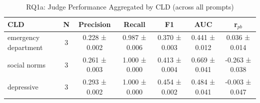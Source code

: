 \begin{table}[htbp]
\centering
\caption{RQ1a: Judge Performance Aggregated by CLD (across all prompts)}
\label{tab:rq1a_by_cld}
\begin{tabular}{lcccccc}
\toprule
\textbf{CLD} & \textbf{N} & \textbf{Precision} & \textbf{Recall} & \textbf{F1} & \textbf{AUC} & \textbf{r$_{pb}$} \\
\midrule
emergency department & 3 & 0.228 ± 0.002 & 0.987 ± 0.006 & 0.370 ± 0.003 & 0.441 ± 0.012 & 0.036 ± 0.014 \\
social norms & 3 & 0.261 ± 0.003 & 1.000 ± 0.000 & 0.413 ± 0.004 & 0.669 ± 0.041 & -0.263 ± 0.038 \\
depressive & 3 & 0.293 ± 0.002 & 1.000 ± 0.000 & 0.454 ± 0.002 & 0.484 ± 0.041 & -0.003 ± 0.047 \\
\bottomrule
\end{tabular}
\end{table}